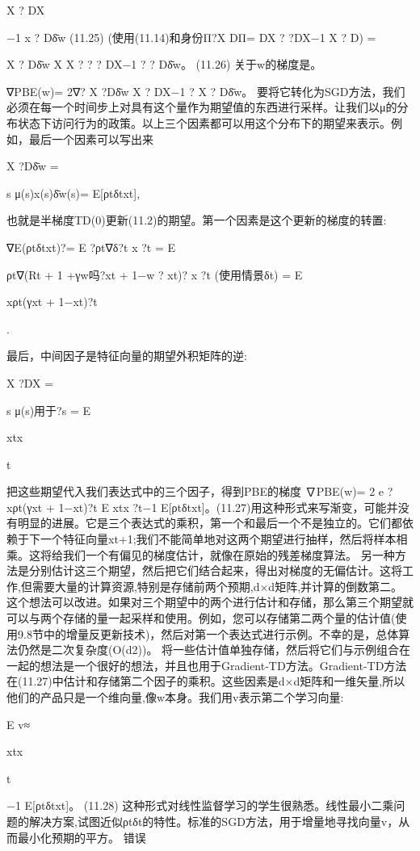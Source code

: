X ? DX

−1 x ? Dδ̄w 					(11.25)
(使用(11.14)和身份Π?X DΠ= DX ? ?DX−1 X ? D)
=

X ? Dδ̄w
X X ? ? ? DX−1 ? ? Dδ̄w。 					(11.26)
关于w的梯度是。

∇PBE(w)= 2∇? X ?Dδ̄w X ? DX−1 ? X ? Dδ̄w。
要将它转化为SGD方法，我们必须在每一个时间步上对具有这个量作为期望值的东西进行采样。让我们以μ的分布状态下访问行为的政策。以上三个因素都可以用这个分布下的期望来表示。例如，最后一个因素可以写出来

X ?Dδ̄w =

s
μ(s)x(s)δ̄w(s)= E[ρtδtxt],

也就是半梯度TD(0)更新(11.2)的期望。第一个因素是这个更新的梯度的转置:

∇E(ρtδtxt)?= E ?ρt∇δ?t x ?t
= E

ρt∇(Rt + 1 +γw吗?xt + 1−w ? xt)? x ?t
(使用情景δt)
= E

xρt(γxt + 1−xt)?t

.




最后，中间因子是特征向量的期望外积矩阵的逆:

X ?DX =

s
μ(s)用于?s = E

xtx

t


把这些期望代入我们表达式中的三个因子，得到PBE的梯度
∇PBE(w)= 2 e ?xρt(γxt + 1−xt)?t E xtx ?t−1 E[ρtδtxt]。(11.27)用这种形式来写渐变，可能并没有明显的进展。它是三个表达式的乘积，第一个和最后一个不是独立的。它们都依赖于下一个特征向量xt+1;我们不能简单地对这两个期望进行抽样，然后将样本相乘。这将给我们一个有偏见的梯度估计，就像在原始的残差梯度算法。
另一种方法是分别估计这三个期望，然后把它们结合起来，得出对梯度的无偏估计。这将工作,但需要大量的计算资源,特别是存储前两个预期,d×d矩阵,并计算的倒数第二。这个想法可以改进。如果对三个期望中的两个进行估计和存储，那么第三个期望就可以与两个存储的量一起采样和使用。例如，您可以存储第二两个量的估计值(使用9.8节中的增量反更新技术)，然后对第一个表达式进行示例。不幸的是，总体算法仍然是二次复杂度(O(d2))。
将一些估计值单独存储，然后将它们与示例组合在一起的想法是一个很好的想法，并且也用于Gradient-TD方法。Gradient-TD方法在(11.27)中估计和存储第二个因子的乘积。这些因素是d×d矩阵和一维矢量,所以他们的产品只是一个维向量,像w本身。我们用v表示第二个学习向量:

E v≈

xtx

t

−1 E[ρtδtxt]。 					(11.28)
这种形式对线性监督学习的学生很熟悉。线性最小二乘问题的解决方案,试图近似ρtδt的特性。标准的SGD方法，用于增量地寻找向量v，从而最小化预期的平方。
错误

